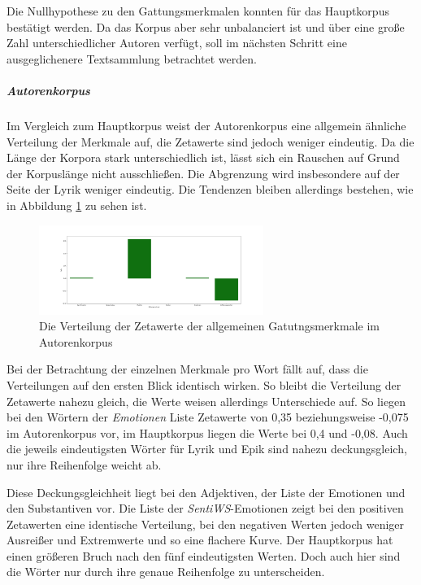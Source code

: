 \documentclass[a4paper,10p]{article}
\begin{document}
Die Nullhypothese zu den Gattungsmerkmalen konnten für das Hauptkorpus bestätigt werden. Da das Korpus aber sehr unbalanciert ist und über eine große Zahl unterschiedlicher Autoren verfügt, soll im nächsten Schritt eine ausgeglichenere Textsammlung betrachtet werden.

\subparagraph{Autorenkorpus} \quad \par 

Im Vergleich zum Hauptkorpus  weist der Autorenkorpus eine allgemein ähn\-lich\-e Verteilung der Merkmale auf, die  Zetawerte sind jedoch weniger eindeutig. Da die Länge der Korpora stark unterschiedlich ist, lässt sich ein Rauschen auf Grund der Korpuslänge nicht ausschließen. Die Abgrenzung wird insbesondere auf der Seite der Lyrik weniger eindeutig. Die Tendenzen bleiben allerdings bestehen, wie in Abbildung  \ref{fig:autoren_alle_merkmale} zu sehen ist. \par 

\begin{figure}
	\includegraphics[width=0.65\textwidth]{autoren_alle_merkmale.png}
	\caption{Die Verteilung der Zetawerte der allgemeinen Gatutngsmerkmale im Autorenkorpus}
	\label{fig:autoren_alle_merkmale}
\end{figure}

Bei der Betrachtung der einzelnen Merkmale pro Wort fällt auf, dass die Verteilungen auf den ersten Blick identisch wirken. So bleibt die Verteilung der Zetawerte nahezu gleich, die Werte weisen allerdings Unterschiede auf. So liegen bei den Wörtern der \emph{Emotionen} Liste Zetawerte von 0,35 beziehungsweise -0,075 im Autorenkorpus vor, im Hauptkorpus liegen die Werte bei 0,4 und -0,08. Auch die jeweils eindeutigsten Wörter für Lyrik und Epik sind nahezu deckungsgleich, nur ihre Reihenfolge weicht ab. \par 

Diese Deckungsgleichheit liegt bei den Adjektiven, der Liste der Emotionen und den Substantiven  vor. Die Liste der \emph{SentiWS}-Emotionen zeigt bei den positiven Zetawerten eine identische Verteilung,  bei den negativen Werten jedoch weniger Ausreißer und Extremwerte und so eine flachere Kurve. Der Hauptkorpus hat einen größeren Bruch nach den fünf eindeutigsten Werten. Doch auch hier sind die Wörter nur durch ihre genaue Reihenfolge zu unterscheiden.  \par 
\end{document}

